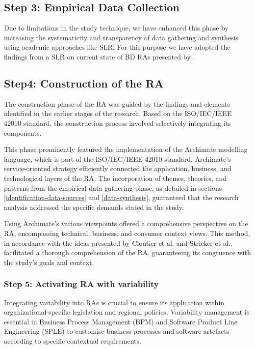 \documentclass[preprint,12pt]{elsarticle}
\begin{document}
\subsection{Step 3: Empirical Data Collection} \label{theSLR}

Due to limitations in the study technique, we have enhanced this phase by increasing the systematicity and transparency of data gathering and synthesis using academic approaches like SLR. For this purpose we have adopted the findings from a SLR on current state of BD RAs presented by \citeauthor{ataei2022state}.

\subsection{Step4: Construction of the RA}
The construction phase of the RA was guided by the findings and elements identified in the earlier stages of the research. Based on the ISO/IEC/IEEE 42010 standard, the construction process involved selectively integrating its components.

This phase prominently featured the implementation of the Archimate modelling language, which is part of the ISO/IEC/IEEE 42010 standard. Archimate's service-oriented strategy efficiently connected the application, business, and technological layers of the RA. The incorporation of themes, theories, and patterns from the empirical data gathering phase, as detailed in sections \ref{identification-data-sources} and \ref{data-synthesis}, guaranteed that the research analysis addressed the specific demands stated in the study.

Using Archimate's various viewpoints offered a comprehensive perspective on the RA, encompassing technical, business, and consumer context views. This method, in accordance with the ideas presented by Cloutier et al. and Stricker et al., facilitated a thorough comprehension of the RA, guaranteeing its congruence with the study's goals and context.


\subsubsection{Step 5: Activating RA with variability}

Integrating variability into RAs is crucial to ensure its application within organizational-specific legislation and regional policies. Variability management is essential in Business Process Management (BPM) and Software Product Line Engineering (SPLE) to customise business processes and software artefacts according to specific contextual requirements.
\end{document}
